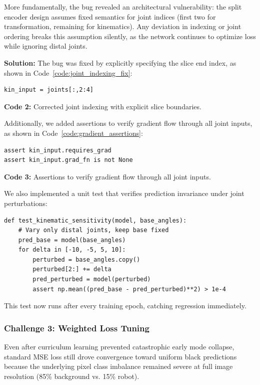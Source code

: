 \documentclass[12pt,a4paper,oneside]{report}
\begin{document}
More fundamentally, the bug revealed an architectural vulnerability: the split encoder design assumes fixed semantics for joint indices (first two for transformation, remaining for kinematics). Any deviation in indexing or joint ordering breaks this assumption silently, as the network continues to optimize loss while ignoring distal joints.

\textbf{Solution:} The bug was fixed by explicitly specifying the slice end index, as shown in Code~\ref{code:joint_indexing_fix}:
\begin{verbatim}
kin_input = joints[:,2:4]
\end{verbatim}
\vspace{0.2cm}
{\small \textbf{Code 2:} Corrected joint indexing with explicit slice boundaries.\label{code:joint_indexing_fix}}
\vspace{0.3cm}

Additionally, we added assertions to verify gradient flow through all joint inputs, as shown in Code~\ref{code:gradient_assertions}:
\begin{verbatim}
assert kin_input.requires_grad
assert kin_input.grad_fn is not None
\end{verbatim}
\vspace{0.2cm}
{\small \textbf{Code 3:} Assertions to verify gradient flow through all joint inputs.\label{code:gradient_assertions}}
\vspace{0.3cm}

We also implemented a unit test that verifies prediction invariance under joint perturbations:

{\footnotesize
\begin{verbatim}
def test_kinematic_sensitivity(model, base_angles):
    # Vary only distal joints, keep base fixed
    pred_base = model(base_angles)
    for delta in [-10, -5, 5, 10]:
        perturbed = base_angles.copy()
        perturbed[2:] += delta
        pred_perturbed = model(perturbed)
        assert np.mean((pred_base - pred_perturbed)**2) > 1e-4
\end{verbatim}
}

This test now runs after every training epoch, catching regression immediately.

\subsubsection{Challenge 3: Weighted Loss Tuning}
\label{subsubsec:challenge_3_weighted_loss_tuning}

Even after curriculum learning prevented catastrophic early mode collapse, standard MSE loss still drove convergence toward uniform black predictions because the underlying pixel class imbalance remained severe at full image resolution (85\% background vs. 15\% robot).
\end{document}
